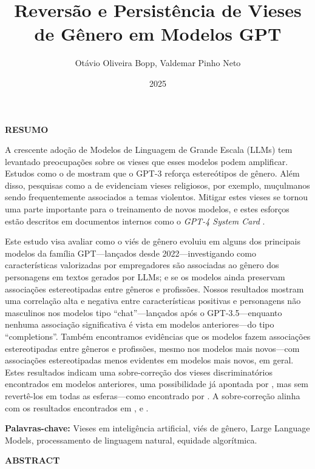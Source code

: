 \documentclass[12pt,a4paper]{article}
\title{Reversão e Persistência de Vieses de Gênero em Modelos GPT}
\author{Otávio Oliveira Bopp, Valdemar Pinho Neto}
\date{2025}
\begin{document}
\maketitle

\noindent\textbf{RESUMO}

\medskip

\noindent A crescente adoção de Modelos de Linguagem de Grande Escala (LLMs) tem levantado preocupações sobre os vieses que esses modelos podem amplificar. Estudos como o de \citet{lucy2021} mostram que o GPT-3 reforça estereótipos de gênero. Além disso, pesquisas como a de \citet{abid2021} evidenciam vieses religiosos, por exemplo, muçulmanos sendo frequentemente associados a temas violentos. Mitigar estes vieses se tornou uma parte importante para o treinamento de novos modelos, e estes esforços estão descritos em documentos internos como o \textit{GPT-4 System Card} \citep{openai2023}.

Este estudo visa avaliar como o viés de gênero evoluiu em alguns dos principais modelos da família GPT---lançados desde 2022---investigando como características valorizadas por empregadores são associadas ao gênero dos personagens em textos gerados por LLMs; e se os modelos ainda preservam associações estereotipadas entre gêneros e profissões. Nossos resultados mostram uma correlação alta e negativa entre características positivas e personagens não masculinos nos modelos tipo ``chat''---lançados após o GPT-3.5---enquanto nenhuma associação significativa é vista em modelos anteriores---do tipo ``completions''. Também encontramos evidências que os modelos fazem associações estereotipadas entre gêneros e profissões, mesmo nos modelos mais novos---com associações estereotipadas menos evidentes em modelos mais novos, em geral. Estes resultados indicam uma sobre-correção dos vieses discriminatórios encontrados em modelos anteriores, uma possibilidade já apontada por \citet{liu2025}, mas sem revertê-los em todas as esferas---como encontrado por \citet{joshi2024}. A sobre-correção alinha com os resultados encontrados em \citet{mirza2024}, \citet{wang2024} e \citet{karvonen2025}.

\medskip

\noindent\textbf{Palavras-chave:} Vieses em inteligência artificial, viés de gênero, Large Language Models, processamento de linguagem natural, equidade algorítmica.

\vspace{1.5cm}
\newpage

\noindent\textbf{ABSTRACT}
\end{document}
